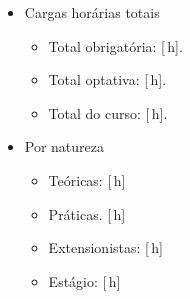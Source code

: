 \documentclass[a4]{ppc-ufscar}
\begin{document}
\begin{itemize}
    \item Cargas horárias totais
    \begin{itemize}
        \item Total obrigatória: [\,h].
        \item Total optativa: [\,h].
        \item[+] Total do curso: [\,h].
    \end{itemize}
    \item Por natureza
    \begin{itemize}
        \item Teóricas: [\,h]
        \item Práticas. [\,h]
        \item Extensionistas: [\,h]
        \item Estágio: [\,h]
    \end{itemize}


\end{itemize}
\end{document}
